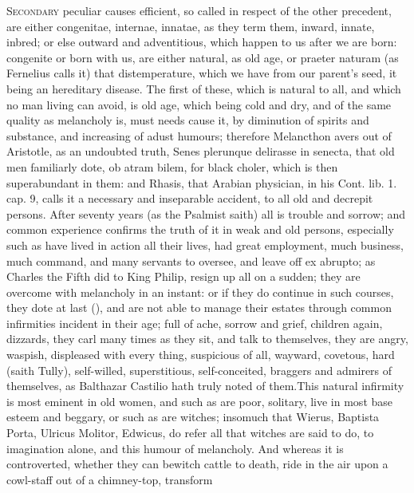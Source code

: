 {{\lettrine{S}{econdary} peculiar causes efficient, so called in respect of the other
precedent, are either congenitae, internae, innatae, as they term them,
inward, innate, inbred; or else outward and adventitious, which happen
to us after we are born: congenite or born with us, are either natural,
as old age, or praeter naturam (as Fernelius calls it) that
distemperature, which we have from our parent's seed, it being an
hereditary disease. The first of these, which is natural to all, and
which no man living can avoid, is old age, which being cold and
dry, and of the same quality as melancholy is, must needs cause it, by
diminution of spirits and substance, and increasing of adust humours;
therefore  Melancthon avers out of Aristotle, as an undoubted
truth, Senes plerunque delirasse in senecta, that old men familiarly
dote, ob atram bilem, for black choler, which is then superabundant in
them: and Rhasis, that Arabian physician, in his Cont. lib. 1. cap. 9,
calls it a necessary and inseparable accident, to all old and
decrepit persons. After seventy years (as the Psalmist saith) all
is trouble and sorrow; and common experience confirms the truth of it
in weak and old persons, especially such as have lived in action all
their lives, had great employment, much business, much command, and
many servants to oversee, and leave off ex abrupto; as Charles
the Fifth did to King Philip, resign up all on a sudden; they are
overcome with melancholy in an instant: or if they do continue in such
courses, they dote at last (), and are not able to
manage their estates through common infirmities incident in their age;
full of ache, sorrow and grief, children again, dizzards, they carl
many times as they sit, and talk to themselves, they are angry,
waspish, displeased with every thing, suspicious of all, wayward,
covetous, hard (saith Tully), self-willed, superstitious,
self-conceited, braggers and admirers of themselves, as Balthazar
Castilio hath truly noted of them.This natural infirmity is most
eminent in old women, and such as are poor, solitary, live in most base
esteem and beggary, or such as are witches; insomuch that Wierus,
Baptista Porta, Ulricus Molitor, Edwicus, do refer all that witches are
said to do, to imagination alone, and this humour of melancholy. And
whereas it is controverted, whether they can bewitch cattle to death,
ride in the air upon a cowl-staff out of a chimney-top, transform
}}
